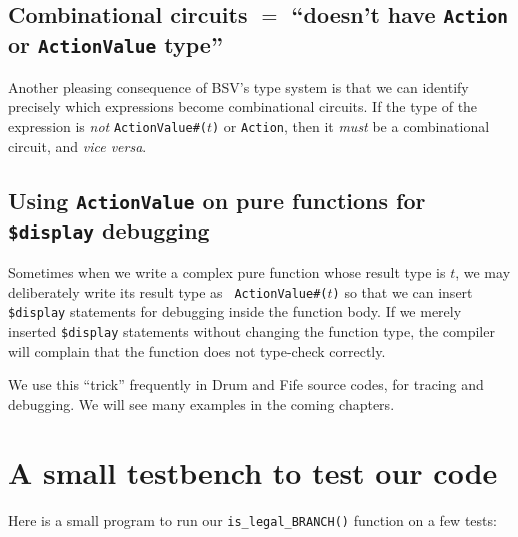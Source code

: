 
\subsection{Combinational circuits $=$ ``doesn't have {\tt Action} or {\tt ActionValue} type''}


Another pleasing consequence of BSV's type system is that we can
identify precisely which expressions become combinational circuits.
If the type of the expression is \emph{not} {\tt ActionValue\#($t$)}
or {\tt Action}, then it \emph{must} be a combinational circuit, and
\emph{vice versa}.


\subsection{Using {\tt ActionValue} on pure functions for {\tt \$display} debugging}

Sometimes when we write a complex pure function whose result type is
$t$, we may deliberately write its result type as {\tt
ActionValue\#($t$)} so that we can insert \verb|$display| statements
for debugging inside the function body.  If we merely inserted
\verb|$display| statements without changing the function type, the
compiler will complain that the function does not type-check
correctly.

We use this ``trick'' frequently in Drum and Fife source codes, for
tracing and debugging.  We will see many examples in the coming
chapters.


\section{A small testbench to test our code}

\label{BSV_small_testbench}


Here is a small program to run our \verb|is_legal_BRANCH()| function on
a few tests:


